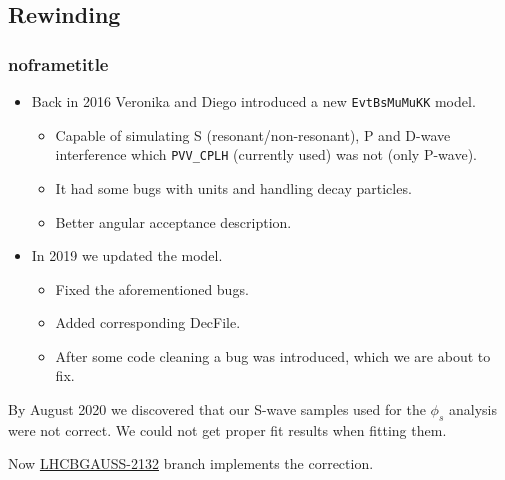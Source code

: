 \documentclass[aspectratio=43,9pt]{beamer}
\begin{document}
\subsection{Rewinding} %
\begin{frame}[default] %
\frametitle{noframetitle}

\begin{itemize}
  \item Back in 2016 Veronika and Diego introduced a new \texttt{EvtBsMuMuKK} model. 
  \begin{itemize}
    \item Capable of simulating S (resonant/non-resonant), P and D-wave interference which \texttt{PVV\_CPLH} (currently used) was not (only P-wave).
    \item It had some bugs with units and handling decay particles.
    \item Better angular acceptance description.
  \end{itemize}
  \item In 2019 we updated the model. \href{https://indico.cern.ch/event/693534/contributions/3248540/attachments/1769507/2874529/EvtGenBsJPsiKK.pdf}{} 
  \begin{itemize}
    \item Fixed the aforementioned bugs.
    \item Added corresponding DecFile.
    \item After some code cleaning a bug was introduced, which we are about to fix.
  \end{itemize}
\end{itemize}

\bigskip 

By August 2020 we discovered that our S-wave samples used for the $\phi_s$ analysis were not correct. We could not get proper fit results when fitting them.

Now \href{https://its.cern.ch/jira/browse/LHCBGAUSS-2132}{LHCBGAUSS-2132} branch implements the correction.

\end{frame}

\end{document}
